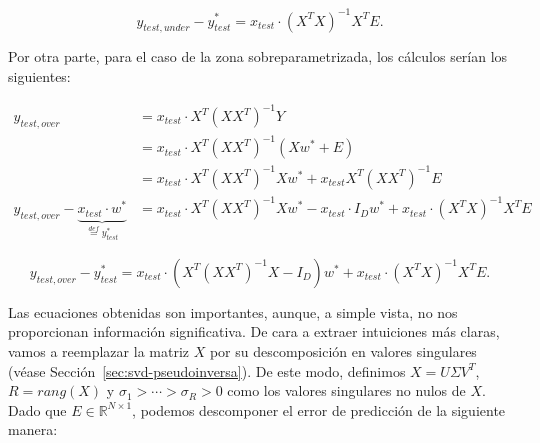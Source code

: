 \begin{equation}
    y_{test, under} - y^{*}_{test} = x_{test} \cdot {(X^T X)}^{-1} X^T E.
\end{equation}\newline

Por otra parte, para el caso de la zona sobreparametrizada, los cálculos serían los siguientes:

\begin{align}
    y_{test, over} &= x_{test} \cdot X^{T}{(XX^{T})}^{-1}Y \\
    &= x_{test} \cdot X^{T}{(XX^{T})}^{-1}(X w^{*} + E) \\
    &= x_{test} \cdot X^{T}{(XX^{T})}^{-1}X w^{*} + x_{test}X^{T}{(XX^{T})}^{-1}E \\
    y_{test, over} - \underbrace{x_{test} \cdot w^{*}}_{\overset{def}{=} y^*_{test}} &= x_{test} \cdot X^{T}{(XX^{T})}^{-1}X w^{*} - x_{test} \cdot I_{D} w^{*} + x_{test} \cdot {(X^{T}X)}^{-1}X^{T}E
\end{align}

\begin{equation}
    y_{test, over} - y^{*}_{test} = x_{test} \cdot (X^{T}{(XX^{T})}^{-1}X - I_{D}) w^{*} + x_{test} \cdot {(X^{T}X)}^{-1}X^{T}E.
\end{equation}\newline


Las ecuaciones obtenidas son importantes, aunque, a simple vista, no nos proporcionan información significativa. De cara a extraer intuiciones más claras, vamos a reemplazar la matriz $X$ por su descomposición en valores singulares (véase Sección~\ref{sec:svd-pseudoinversa}). De este modo, definimos $X = U \Sigma V^{T}$, $R = rang(X)$ y $\sigma_1 > \cdots > \sigma_R > 0$ como los valores singulares no nulos de $X$. Dado que $E \in \mathbb{R}^{N \times 1}$, podemos descomponer el error de predicción de la siguiente manera:

